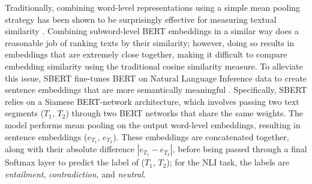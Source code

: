 \documentclass[thesis.tex]{subfiles}
\begin{document}
Traditionally, combining word-level representations using a simple mean pooling strategy has been shown to be surprisingly effective for measuring textual similarity \cite{faruqui2015retrofitting, yu2014deep, kenter2015short}. Combining subword-level BERT embeddings in a similar way does a reasonable job of ranking texts by their similarity; however, doing so results in embeddings that are extremely close together, making it difficult to compare embedding similarity using the traditional cosine similarity measure. To alleviate this issue, SBERT fine-tunes BERT on Natural Language Inference data to create sentence embeddings that are more semantically meaningful \citep{reimers2019sentence}. Specifically, SBERT relies on a Siamese BERT-network architecture, which involves passing two text segments ($T_1$, $T_2$) through two BERT networks that share the same weights. The model performs mean pooling on the output word-level embeddings, resulting in sentence embeddings ($e_{T_1}$, $e_{T_2}$). These embeddings are concatenated together, along with their absolute difference $|e_{T_1} - e_{T_2}|$, before being passed through a final Softmax layer to predict the label of ($T_1$, $T_2$); for the NLI task, the labels are \textit{entailment}, \textit{contradiction}, and \textit{neutral}.

\biblio
\end{document}
